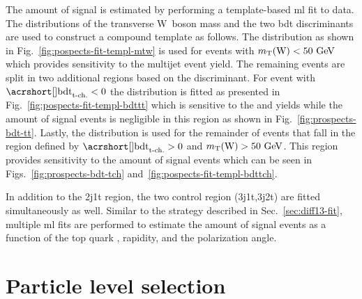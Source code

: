The amount of signal is estimated by performing a template-based \gls{ml} fit to data. The distributions of the transverse W~boson mass and the two \gls{bdt} discriminants are used to construct a compound template as follows. The \mtw distribution as shown in Fig.~\ref{fig:pospects-fit-templ-mtw} is used for events with $m_{\textrm{T}}(\textrm{W})<50~\textrm{GeV}$ which provides sensitivity to the multijet event yield. The remaining events are split in two additional regions based on the \bdttch discriminant. For event with $\bdttch<0$ the \bdttt distribution is fitted as presented in Fig.~\ref{fig:pospects-fit-templ-bdttt} which is sensitive to the \wjets and \ttbar yields while the amount of signal events is negligible in this region as shown in Fig.~\ref{fig:prospects-bdt-tt}. Lastly, the \bdttch distribution is used for the remainder of events that fall in the region defined by $\bdttch>0$ and $m_{\textrm{T}}(\textrm{W})>50~\textrm{GeV}$. This region provides sensitivity to the amount of signal events which can be seen in Figs.~\ref{fig:prospects-bdt-tch} and~\ref{fig:pospects-fit-templ-bdttch}.


In addition to the 2j1t region, the two \ttbar control region (3j1t,3j2t) are fitted simultaneously as well. Similar to the strategy described in Sec.~\ref{sec:diff13-fit}, multiple \gls{ml} fits are performed to estimate the amount of signal events as a function of the top quark \pt, rapidity, and the polarization angle.

 

\section{Particle level selection}
\label{sec:prospects-fiducial-studies}

